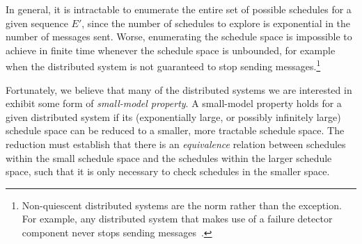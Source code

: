 




In general, it is intractable to enumerate the entire set of possible schedules
for a given sequence $E'$, since the number of schedules to explore is exponential
in the number of messages sent. Worse, enumerating the schedule space is
impossible to achieve in finite time whenever the schedule space is unbounded,
for example when the distributed system is not guaranteed to stop sending
messages.\footnote{Non-quiescent distributed systems are the norm rather than
the exception. For example, any distributed system that makes use of a failure
detector component never stops sending messages~\cite{aguilera1997heartbeat}.}



Fortunately, we \num{believe} that many of the distributed systems we are interested in exhibit some
form of {\em small-model property}. A small-model property holds for a given
distributed system if its (exponentially large, or possibly infinitely large) schedule space can be reduced
to a smaller, more tractable schedule space. The reduction must establish that
there is an {\em equivalence} relation between schedules within the small
schedule space and the schedules within the larger schedule space, such that
it is only necessary to check schedules in the smaller space.

